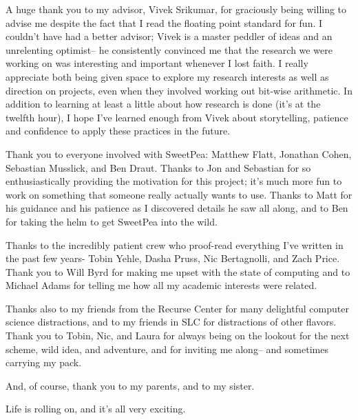 
A huge thank you to my advisor, Vivek Srikumar, for graciously being willing to advise me despite the fact that I read the floating point standard for fun. I couldn't have had a better advisor; Vivek is a master peddler of ideas and an unrelenting optimist-- he consistently convinced me that the research we were working on was interesting and important whenever I lost faith. I really appreciate both being given space to explore my research interests as well as direction on projects, even when they involved working out bit-wise arithmetic. In addition to learning at least a little about how research is done (it's at the twelfth hour), I hope I've learned enough from Vivek about storytelling, patience and confidence to apply these practices in the future.

Thank you to everyone involved with SweetPea: Matthew Flatt, Jonathan Cohen, Sebastian Musslick, and Ben Draut. Thanks to Jon and Sebastian for so enthusiastically providing the motivation for this project; it's much more fun to work on something that someone really actually wants to use. Thanks to Matt for his guidance and his patience as I discovered details he saw all along, and to Ben for taking the helm to get SweetPea into the wild.

Thanks to the incredibly patient crew who proof-read everything I've written in the past few years- Tobin Yehle, Dasha Pruss, Nic Bertagnolli, and Zach Price. Thank you to Will Byrd for making me upset with the state of computing and to Michael Adams for telling me how all my academic interests were related.

Thanks also to my friends from the Recurse Center for many delightful computer science distractions, and to my friends in SLC for distractions of other flavors. Thank you to Tobin, Nic, and Laura for always being on the lookout for the next scheme, wild idea, and adventure, and for inviting me along-- and sometimes carrying my pack.

And, of course, thank you to my parents, and to my sister.

Life is rolling on, and it's all very exciting.
